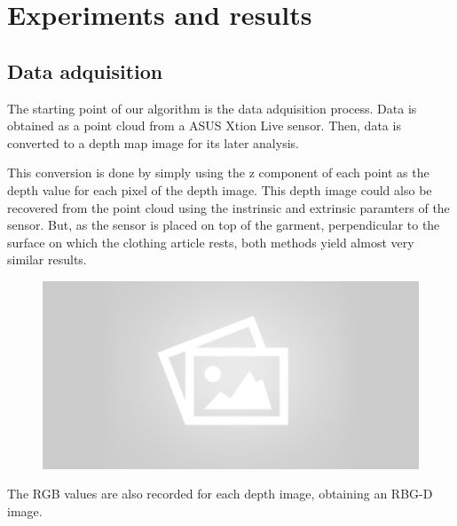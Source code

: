 \chapter{Experiments and results}
\label{experiments_and_results}



\section{Data adquisition}
\label{data_adquisition}

The starting point of our algorithm is the data adquisition process. Data is obtained as a point cloud from a ASUS Xtion Live sensor. Then, data is converted to a depth map image for its later analysis. 

This conversion is done by simply using the z component of each point as the depth value for each pixel of the depth image. This depth image could also be recovered from the point cloud using the instrinsic and extrinsic paramters of the sensor. But, as the sensor is placed on top of the garment, perpendicular to the surface on which the clothing article rests, both methods yield almost very similar results.

\begin{figure}[thpb]
    \centering
    \includegraphics[width=0.7
    \textwidth]{figures/placeholder2.png}
    \caption{}
    \label{fig:point_cloud_and_depth_image}
\end{figure}

The RGB values are also recorded for each depth image, obtaining an RBG-D image.




